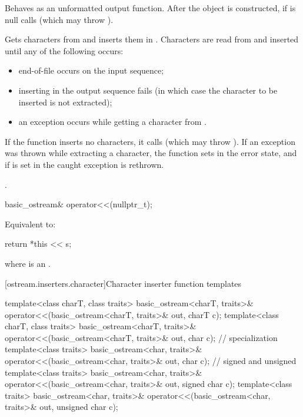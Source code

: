 \begin{itemdescr}
\pnum
\effects
Behaves as an unformatted output function.
After the  object is
constructed, if
 is null calls
(which may throw
).

\pnum
Gets characters from 
and inserts them in
.
Characters are read from 
and inserted until any of the following occurs:
\begin{itemize}
\item
end-of-file occurs on the input sequence;
\item
inserting in the output sequence fails
(in which case the character to be inserted is not extracted);
\item
an exception occurs while getting a character from .
\end{itemize}

\pnum
If the function inserts no characters, it calls
(which may throw
).
If an exception was thrown while extracting a character,
the function sets
in the error state, and if
is set in
the caught exception is rethrown.

\pnum
\returns
{}.
\end{itemdescr}

%
\begin{itemdecl}
basic_ostream& operator<<(nullptr_t);
\end{itemdecl}

\begin{itemdescr}
\pnum
\effects
Equivalent to:
\begin{codeblock}
return *this << s;
\end{codeblock}
where  is an
.
\end{itemdescr}

[ostream.inserters.character]{Character inserter function templates}

%
\begin{itemdecl}
template<class charT, class traits>
  basic_ostream<charT, traits>& operator<<(basic_ostream<charT, traits>& out, charT c);
template<class charT, class traits>
  basic_ostream<charT, traits>& operator<<(basic_ostream<charT, traits>& out, char c);
// specialization
template<class traits>
  basic_ostream<char, traits>& operator<<(basic_ostream<char, traits>& out, char c);
// signed and unsigned
template<class traits>
  basic_ostream<char, traits>& operator<<(basic_ostream<char, traits>& out, signed char c);
template<class traits>
  basic_ostream<char, traits>& operator<<(basic_ostream<char, traits>& out, unsigned char c);
\end{itemdecl}


